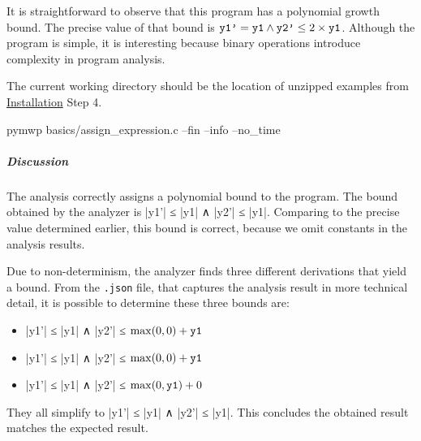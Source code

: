 It is straightforward to observe that this program has a polynomial growth
bound. The precise value of that bound is \(\prm{y1'} = \prm{y1} \land \prm{y2'}
\leq 2 \times \prm{y1}\). Although the program is simple, it is
interesting because binary operations introduce complexity in program analysis.

The current working directory should be the location of unzipped examples from
\hyperref[guide-install]{Installation} Step 4.

\begin{center}
\begin{minipage}{\textwidth}
\begin{cmdlisting}[label={lst:ex1-run}]
pymwp basics/assign_expression.c --fin --info --no_time
\end{cmdlisting}
\end{minipage}
\end{center}

\begin{center}
\begin{minipage}{\textwidth}
\end{minipage}
\label{lst:ex-output}
\end{center}

\subparagraph*{Discussion}
The analysis correctly assigns a polynomial bound to the program. The bound
obtained by the analyzer is \pr|y1'| ≤ \pr|y1| ∧
\pr|y2'| ≤ \pr|y1|. Comparing to the precise value determined
earlier, this bound is correct, because we omit constants in the analysis
results.

Due to non-determinism, the analyzer finds three different
derivations that yield a bound. From the \texttt{.json} file, that captures the
analysis result in more technical detail, it is possible to determine these
three bounds are:
\begin{itemize}
\item \pr|y1'| ≤ \pr|y1| ∧ \pr|y2'| ≤ \(\max(0,0) + \prm{y1}\)
\item \pr|y1'| ≤ \pr|y1| ∧ \pr|y2'| ≤ \(\max(0,0) + \prm{y1}\)
\item \pr|y1'| ≤ \pr|y1| ∧ \pr|y2'| ≤ \(\max(0,\prm{y1}) + 0\)
\end{itemize}
They all simplify to \pr|y1'| ≤ \pr|y1| ∧ \pr|y2'| ≤ \pr|y1|.
This concludes the obtained result matches the expected result.

